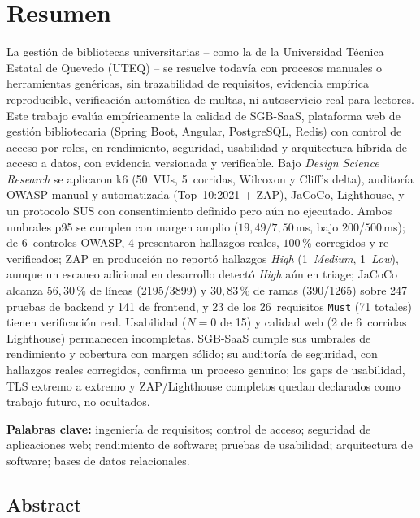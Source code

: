 \chapter*{Resumen}

La gestión de bibliotecas universitarias -- como la de la Universidad
Técnica Estatal de Quevedo (UTEQ) -- se resuelve todavía con procesos
manuales o herramientas genéricas, sin trazabilidad de requisitos,
evidencia empírica reproducible, verificación automática de multas, ni
autoservicio real para lectores. Este trabajo evalúa empíricamente la
calidad de SGB-SaaS, plataforma web de gestión bibliotecaria (Spring
Boot, Angular, PostgreSQL, Redis) con control de acceso por roles, en
rendimiento, seguridad, usabilidad y arquitectura híbrida de acceso a
datos, con evidencia versionada y verificable. Bajo \emph{Design
Science Research} se aplicaron k6 (50~VUs, 5~corridas, Wilcoxon y
Cliff's delta), auditoría OWASP manual y automatizada (Top~10:2021 +
ZAP), JaCoCo, Lighthouse, y un protocolo SUS con consentimiento
definido pero aún no ejecutado. Ambos umbrales p95 se cumplen con
margen amplio ($19{,}49$/$7{,}50$\,ms, bajo $200$/$500$\,ms); de
6~controles OWASP, 4 presentaron hallazgos reales, $100$\,\%
corregidos y re-verificados; ZAP en producción no reportó hallazgos
\emph{High} (1~\emph{Medium}, 1~\emph{Low}), aunque un escaneo
adicional en desarrollo detectó \emph{High} aún en triage; JaCoCo
alcanza $56{,}30$\,\% de líneas (2195/3899) y $30{,}83$\,\% de ramas
(390/1265) sobre 247
pruebas de backend y 141 de frontend, y 23 de los 26~requisitos
\texttt{Must} (71 totales) tienen verificación real. Usabilidad ($N=0$ de 15) y calidad
web (2 de 6~corridas Lighthouse) permanecen incompletas. SGB-SaaS
cumple sus umbrales de rendimiento y cobertura con margen sólido; su
auditoría de seguridad, con hallazgos reales corregidos, confirma un
proceso genuino; los gaps de usabilidad, TLS extremo a extremo y
ZAP/Lighthouse completos quedan declarados como trabajo futuro, no
ocultados.

\textbf{Palabras clave:} ingeniería de requisitos; control de acceso;
seguridad de aplicaciones web; rendimiento de software; pruebas de
usabilidad; arquitectura de software; bases de datos relacionales.

\section*{Abstract}

